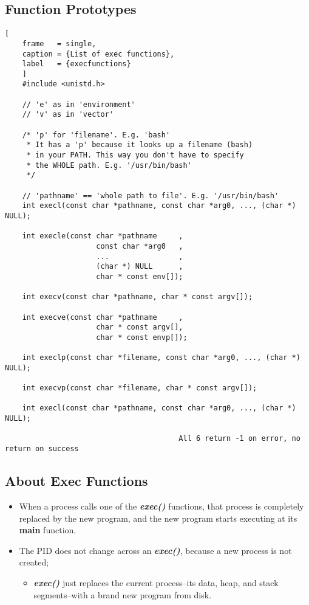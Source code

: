 \documentclass{article}
\newcommand\be[1]{\textbf{\emph{#1}}}
\begin{document}
\subsection{Function Prototypes}
\begin{lstlisting}[
    frame   = single,
    caption = {List of exec functions},
    label   = {execfunctions}
    ]
    #include <unistd.h>

    // 'e' as in 'environment'
    // 'v' as in 'vector'

    /* 'p' for 'filename'. E.g. 'bash'
     * It has a 'p' because it looks up a filename (bash)
     * in your PATH. This way you don't have to specify
     * the WHOLE path. E.g. '/usr/bin/bash'
     */

    // 'pathname' == 'whole path to file'. E.g. '/usr/bin/bash'
    int execl(const char *pathname, const char *arg0, ..., (char *) NULL);

    int execle(const char *pathname     , 
                     const char *arg0   , 
                     ...                , 
                     (char *) NULL      , 
                     char * const env[]);

    int execv(const char *pathname, char * const argv[]);

    int execve(const char *pathname     , 
                     char * const argv[], 
                     char * const envp[]);

    int execlp(const char *filename, const char *arg0, ..., (char *) NULL);

    int execvp(const char *filename, char * const argv[]);

    int execl(const char *pathname, const char *arg0, ..., (char *) NULL);

                                        All 6 return -1 on error, no return on success
\end{lstlisting}
\subsection{About Exec Functions}
\begin{itemize}
    \item When a process calls one of the \be{exec()} functions, that process
        is completely replaced by the new program, and the new program
        starts executing at its \textbf{main} function.
    \item The PID does not change across an \be{exec()}, because a new process 
        is not created;
        \begin{itemize}
            \item \be{exec()} just replaces the current process--its data, heap, 
                and stack segments--with a brand new program from disk.
        \end{itemize}

\end{itemize}
\clearpage
\end{document}
